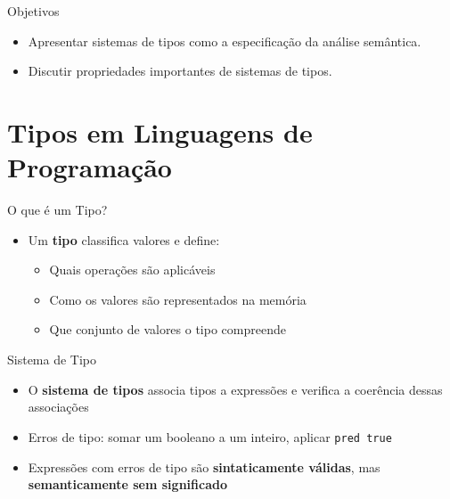 \subtitle{\bf Aula 15 - Tipos em Linguagens de Programação}
\begin{frame}[t,plain]
    \titlepage
\end{frame}

\begin{frame}{Objetivos}

    \begin{itemize}
        \item
        Apresentar sistemas de tipos como a especificação da análise
        semântica.
        \item
        Discutir propriedades importantes de sistemas de tipos.
    \end{itemize}
\end{frame}


\section{Tipos em Linguagens de
Programação}\label{tipos-em-linguagens-de-programauxe7uxe3o}

\begin{frame}{O que é um Tipo?}

    \begin{itemize}

        \item
        Um \textbf{tipo} classifica valores e define:

        \begin{itemize}

            \item
            Quais operações são aplicáveis
            \item
            Como os valores são representados na memória
            \item
            Que conjunto de valores o tipo compreende
        \end{itemize}
    \end{itemize}
\end{frame}

\begin{frame}[fragile]{Sistema de Tipo}

    \begin{itemize}

        \item
        O \textbf{sistema de tipos} associa tipos a expressões e verifica a
        coerência dessas associações
        \item
        Erros de tipo: somar um booleano a um inteiro, aplicar
        \texttt{pred true}
        \item
        Expressões com erros de tipo são \textbf{sintaticamente válidas}, mas
        \textbf{semanticamente sem significado}
    \end{itemize}
\end{frame}

